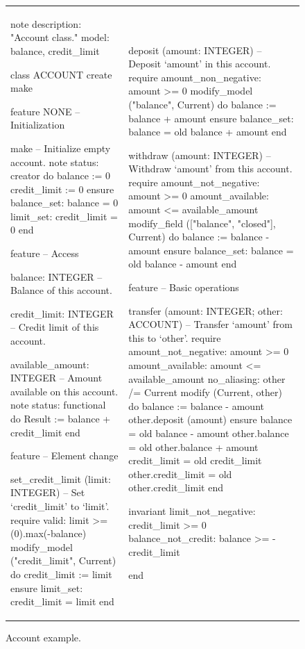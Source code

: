 \begin{figure}
\begin{tabular}{ll}
{\begin{erunning}[basicstyle=\scriptsize,numbers=left]
note
	description: "Account class."
	model: balance, credit_limit

class ACCOUNT
create make

feature {NONE} -- Initialization

	make
			-- Initialize empty account.
		note
			status: creator
		do
			balance := 0
			credit_limit := 0
		ensure
			balance_set: balance = 0
			limit_set: credit_limit = 0
		end

feature -- Access

	balance: INTEGER
			-- Balance of this account.

	credit_limit: INTEGER
			-- Credit limit of this account.

	available_amount: INTEGER
			-- Amount available on this account.
		note status: functional
		do
			Result := balance + credit_limit
		end

feature -- Element change

	set_credit_limit (limit: INTEGER)
			-- Set `credit_limit' to `limit'.
		require
			valid: limit >= (0).max(-balance)
			modify_model ("credit_limit", Current)
		do
			credit_limit := limit
		ensure
			limit_set: credit_limit = limit
		end
\end{erunning}}
&
\hspace{3mm}
{\begin{erunning}[basicstyle=\scriptsize,numbers=left,firstnumber=last]

	deposit (amount: INTEGER)
			-- Deposit `amount' in this account.
		require
			amount_non_negative: amount >= 0
			modify_model ("balance", Current)
		do
			balance := balance + amount
		ensure
			balance_set: balance = old balance + amount
		end

	withdraw (amount: INTEGER)
			-- Withdraw `amount' from this account.
		require
			amount_not_negative: amount >= 0
			amount_available: amount <= available_amount
			modify_field (["balance", "closed"], Current)
		do
			balance := balance - amount
		ensure
			balance_set: balance = old balance - amount
		end

feature -- Basic operations

	transfer (amount: INTEGER; other: ACCOUNT)
			-- Transfer `amount' from this to `other'.
		require
			amount_not_negative: amount >= 0
			amount_available: amount <= available_amount
			no_aliasing: other /= Current
			modify (Current, other)
		do
			balance := balance - amount
			other.deposit (amount)
		ensure
			balance = old balance - amount
			other.balance = old other.balance + amount
			credit_limit = old credit_limit
			other.credit_limit = old other.credit_limit
		end

invariant
	limit_not_negative: credit_limit >= 0
	balance_not_credit: balance >= -credit_limit

end
\end{erunning}}
\end{tabular}
\caption{Account example.}
\label{code:account}
\end{figure}


